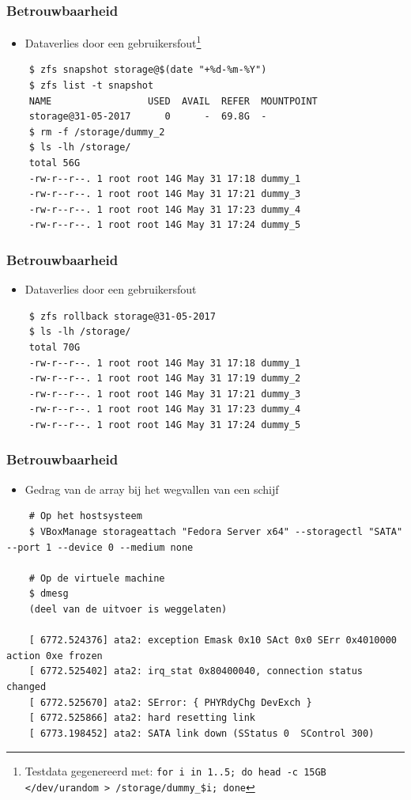 \documentclass{beamer}
\begin{document}

\begin{frame}[fragile]
  \frametitle{Betrouwbaarheid}
  \begin{itemize}
    \item Dataverlies door een gebruikersfout\footnote{Testdata gegenereerd met: \texttt{for i in {1..5}; do head -c 15GB </dev/urandom > /storage/dummy\_\$i; done}}
  \end{itemize}

  \begin{verbatim}
    $ zfs snapshot storage@$(date "+%d-%m-%Y")
    $ zfs list -t snapshot
    NAME                 USED  AVAIL  REFER  MOUNTPOINT
    storage@31-05-2017      0      -  69.8G  -
    $ rm -f /storage/dummy_2
    $ ls -lh /storage/
    total 56G
    -rw-r--r--. 1 root root 14G May 31 17:18 dummy_1
    -rw-r--r--. 1 root root 14G May 31 17:21 dummy_3
    -rw-r--r--. 1 root root 14G May 31 17:23 dummy_4
    -rw-r--r--. 1 root root 14G May 31 17:24 dummy_5
  \end{verbatim}
\end{frame}


\begin{frame}[fragile]
  \frametitle{Betrouwbaarheid}
  \begin{itemize}
    \item Dataverlies door een gebruikersfout  
  \end{itemize}

  \begin{verbatim}
    $ zfs rollback storage@31-05-2017
    $ ls -lh /storage/
    total 70G
    -rw-r--r--. 1 root root 14G May 31 17:18 dummy_1
    -rw-r--r--. 1 root root 14G May 31 17:19 dummy_2
    -rw-r--r--. 1 root root 14G May 31 17:21 dummy_3
    -rw-r--r--. 1 root root 14G May 31 17:23 dummy_4
    -rw-r--r--. 1 root root 14G May 31 17:24 dummy_5
  \end{verbatim}
\end{frame}

\begin{frame}[fragile]
  \frametitle{Betrouwbaarheid}
  \begin{itemize}
    \item Gedrag van de array bij het wegvallen van een schijf
  \end{itemize}
  \begin{verbatim}
    # Op het hostsysteem
    $ VBoxManage storageattach "Fedora Server x64" --storagectl "SATA" --port 1 --device 0 --medium none

    # Op de virtuele machine
    $ dmesg
    (deel van de uitvoer is weggelaten)

    [ 6772.524376] ata2: exception Emask 0x10 SAct 0x0 SErr 0x4010000 action 0xe frozen
    [ 6772.525402] ata2: irq_stat 0x80400040, connection status changed
    [ 6772.525670] ata2: SError: { PHYRdyChg DevExch } 
    [ 6772.525866] ata2: hard resetting link
    [ 6773.198452] ata2: SATA link down (SStatus 0  SControl 300)
  \end{verbatim}
\end{frame}
\end{document}
